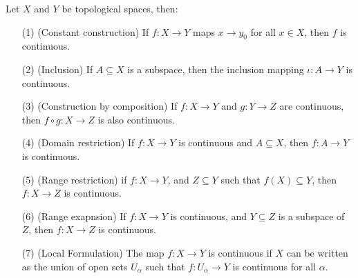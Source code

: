 \begin{theorem}\label{1.7.3}
    Let $X$ and  $Y$ be topological spaces, then:
        \begin{enumerate}
            \item[(1)] (Constant construction) If $f:X \rightarrow Y$ maps  $x \rightarrow y_0$ for all
                $x \in X$, then  $f$ is continuous.

            \item[(2)]  (Inclusion) If $A \subseteq X$ is a subspace, then the inclusion mapping  $\iota:A
                \rightarrow Y$ is continuous.

            \item[(3)] (Construction by composition) If $f:X \rightarrow Y$ and  $g:Y \rightarrow Z$ are
                continuous, then  $f \circ g: X \rightarrow Z$ is also continuous.

            \item[(4)]  (Domain restriction) If  $f:X \rightarrow Y$ is continuous and  $A \subseteq X$,
                then  $f:A \rightarrow Y$ is continuous.

            \item[(5)]  (Range restriction) if $f:X \rightarrow Y$, and  $Z \subseteq Y$ such that  $f(X)
                \subseteq Y$, then $f:X \rightarrow Z$ is continuous.

            \item[(6)]  (Range exapnsion) If $f:X \rightarrow Y$ is continuous, and  $Y \subseteq Z$ is a
                subspace of  $Z$, then  $f:X \rightarrow Z$ is continuous.

            \item[(7)]  (Local Formulation) The map $f:X \rightarrow Y$ is continuous if  $X$ can be
                written as the union of open sets  $U_{\alpha}$ such that $f:U_{\alpha} \rightarrow
                Y$ is continuous for all $\alpha$.
        \end{enumerate}
\end{theorem}
